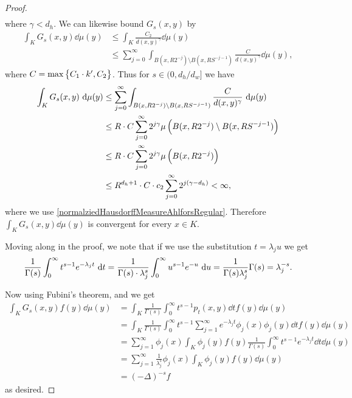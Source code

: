 \begin{proof}
\begin{align}
	\end{align}
	where $\gamma < d_h$. We can likewise bound $G_{s}(x,y)$ by
	\begin{align}
		\int_{K} G_s(x,y) \dd \mu(y) &\leq \int_{K} \frac{C_2}{d(x,y)^{\gamma}}\dd \mu(y)\\
		& \leq  \sum_{j = 0}^{\infty} \int_{B(x, R2^{-j})\setminus B(x,RS^{-j-1})} \frac{C}{d(x,y)^{\gamma}}\dd \mu(y), 
	\end{align}
	where $C = \max\cbr{C_1 \cd k', C_2}$. Thus for $s \in (0, d_h/d_w]$ we have
	\begin{align}
		\int_{K} G_s(x,y) \dd \mu(y) & \leq  \sum_{j = 0}^{\infty} \int_{B(x, R2^{-j})\setminus B(x,RS^{-j-1})} \frac{C}{d(x,y)^{\gamma}}\dd \mu(y) \\
		& \leq R\cd C \sum_{j = 0}^{\infty} 2^{j \gamma} \mu \left(B(x, R2^{-j})\setminus B(x,RS^{-j-1})\right)  \\
		&\leq R\cd C \sum_{j = 0}^{\infty} 2^{j \gamma} \mu \left(B(x, R2^{-j})\right) \\
		& \leq R^{d_h +1} \cd C \cd c_2 \sum_{j = 0}^{\infty} 2^{j(\gamma - d_h)} < \infty,
	\end{align}
	where we use \cref{normalziedHausdorffMeasureAhlforsRegular}. Therefore $\int_{K}G_s(x,y)\dd \mu(y)$ is convergent for every $x \in K$.
	
	\medskip
	Moving along in the proof, we note that if we use the substitution $t = \lambda_j u$ we get 
	\begin{align}
		\frac{1}{\Gamma(s)} \int_{0}^{\infty} t^{s-1}e^{-\lambda_j t} \ \text{d} t = \frac{1}{\Gamma(s) \cdot \lambda_j^s} \int_{0}^{\infty} u^{s-1}e^{-u} \ \text{d} u = \frac{1}{\Gamma(s)\lambda_{j}^{s}} \Gamma(s) = \lambda_j^{-s}.
	\end{align}
	
	\noi Now using Fubini's theorem,  and   we get
	\begin{align}
		\int_{K} G_s(x,y) f(y) \dd \mu (y) & = \int_{K} \frac{1}{\Gamma(s)}\int_{0}^{\infty} t^{s-1}p_t(x,y) \dd t f(y)\dd \mu (y) \\
		&= \int_{K} \frac{1}{\Gamma(s)}\int_{0}^{\infty} t^{s-1} \sum_{j = 1}^{\infty} e^{-\lambda_j t} \phi_j(x)\phi_j(y)  \dd t f(y)\dd \mu (y) \\
		&= \sum_{j = 1}^{\infty} \phi_j(x) \int_{K}\phi_{j}(y) f(y)  \frac{1}{\Gamma(s)} \int_{0}^{\infty} t^{s-1}e^{-\lambda_j t} \dd t \dd \mu(y) \\
		&= \sum_{j = 1}^{\infty} \frac{1}{\lambda_{j}^{s}} \phi_j(x) \int_{K}\phi_j(y)f(y) \dd \mu(y) \\
		&= (-\Delta)^{-s}f
 	\end{align}
 	as desired.
\end{proof}

